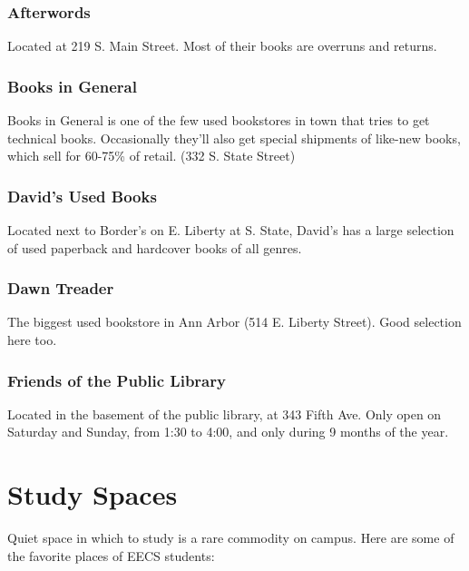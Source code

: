 \documentclass[11pt]{article}
\begin{document}
\subsubsection{Afterwords}
\label{sec-8_5_1}

Located at 219 S. Main Street.  Most of their books are overruns and returns.
\subsubsection{Books in General}
\label{sec-8_5_2}

Books in General is one of the few used bookstores in town that tries to get technical books. Occasionally they'll also get special shipments of like-new books, which sell for 60-75\% of retail. (332 S. State Street)
\subsubsection{David’s Used Books}
\label{sec-8_5_3}

Located next to Border’s on E. Liberty at S. State, David’s has a large selection of used paperback and hardcover books of all genres.
\subsubsection{Dawn Treader}
\label{sec-8_5_4}

The biggest used bookstore in Ann Arbor (514 E. Liberty Street).  Good selection here too.
\subsubsection{Friends of the Public Library}
\label{sec-8_5_5}

Located in the basement of the public library, at 343 Fifth Ave.  Only open on Saturday and Sunday, from 1:30 to 4:00, and only during 9 months of the year.
\section{Study Spaces}
\label{sec-9}

Quiet space in which to study is a rare commodity on campus. Here are some of the favorite places of EECS students:
\end{document}
